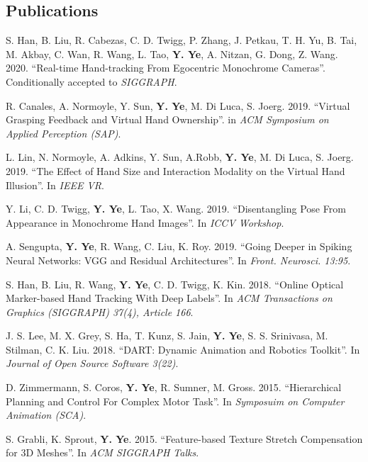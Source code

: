\documentclass[margin,line]{res}
\begin{document}
\begin{resume}
\section{\sc Publications}

S. Han, B. Liu, R. Cabezas, C. D. Twigg, P. Zhang, J. Petkau, T. H. Yu, B. Tai, M. Akbay, C. Wan, R. Wang, L. Tao, {\bf Y. Ye}, A. Nitzan, G. Dong, Z. Wang. 2020. ``Real-time Hand-tracking From Egocentric Monochrome Cameras''. Conditionally accepted to {\em SIGGRAPH}.

\vspace*{-.1in}
R. Canales, A. Normoyle, Y. Sun, {\bf Y. Ye}, M. Di Luca, S. Joerg. 2019. ``Virtual Grasping Feedback and Virtual Hand Ownership''. in {\em ACM Symposium on Applied Perception (SAP)}.

\vspace*{-.1in}
L. Lin, N. Normoyle, A. Adkins, Y. Sun, A.Robb, {\bf Y. Ye}, M. Di Luca, S. Joerg. 2019. ``The Effect of Hand Size and Interaction Modality on the Virtual Hand Illusion''. In {\em IEEE VR}.

\vspace*{-.1in}
Y. Li, C. D. Twigg, {\bf Y. Ye}, L. Tao, X. Wang. 2019. ``Disentangling Pose From Appearance in Monochrome Hand Images''. In {\em ICCV Workshop}.

\vspace*{-.1in}
A. Sengupta, {\bf Y. Ye}, R. Wang, C. Liu, K. Roy. 2019. ``Going Deeper in Spiking Neural Networks: VGG and Residual Architectures''. In {\em Front. Neurosci. 13:95}.

\vspace*{-.1in}
S. Han, B. Liu, R. Wang, {\bf Y. Ye}, C. D. Twigg, K. Kin. 2018. ``Online Optical Marker-based Hand Tracking With Deep Labels''. In {\em ACM Transactions on Graphics (SIGGRAPH) 37(4), Article 166}.

\vspace*{-.1in}
J. S. Lee, M. X. Grey, S. Ha, T. Kunz, S. Jain, {\bf Y. Ye}, S. S. Srinivasa, M. Stilman, C. K. Liu. 2018. ``DART: Dynamic Animation and Robotics Toolkit''. In {\em Journal of Open Source Software 3(22)}.

\vspace*{-.1in}
D. Zimmermann, S. Coros, {\bf Y. Ye}, R. Sumner, M. Gross. 2015. ``Hierarchical Planning and Control For Complex Motor Task''. In {\em Symposuim on Computer Animation (SCA)}.

\vspace*{-.1in}
S. Grabli, K. Sprout, {\bf Y. Ye}. 2015. ``Feature-based Texture Stretch Compensation for 3D Meshes''. In {\em ACM SIGGRAPH Talks}.


\end{resume}
\end{document}
